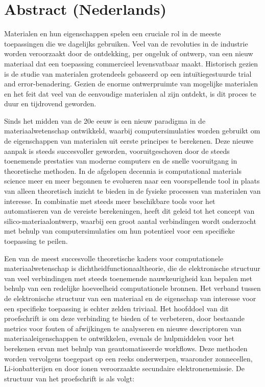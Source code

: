 \section*{Abstract (Nederlands)} \label{chapter:abstract_nederlands}

Materialen en hun eigenschappen spelen een cruciale rol in de meeste toepassingen die we dagelijks gebruiken. Veel van de revoluties in de industrie worden veroorzaakt door de ontdekking, per ongeluk of ontwerp, van een nieuw materiaal dat een toepassing commercieel levensvatbaar maakt. Historisch gezien is de studie van materialen grotendeels gebaseerd op een intuïtiegestuurde trial and error-benadering. Gezien de enorme ontwerpruimte van mogelijke materialen en het feit dat veel van de eenvoudige materialen al zijn ontdekt, is dit proces te duur en tijdrovend geworden.

Sinds het midden van de 20e eeuw is een nieuw paradigma in de materiaalwetenschap ontwikkeld, waarbij computersimulaties worden gebruikt om de eigenschappen van materialen uit eerste principes te berekenen. Deze nieuwe aanpak is steeds succesvoller geworden, vooruitgeschoven door de steeds toenemende prestaties van moderne computers en de snelle vooruitgang in theoretische methoden. In de afgelopen decennia is computational materials science meer en meer begonnen te evolueren naar een voorspellende tool in plaats van alleen theoretisch inzicht te bieden in de fysieke processen van materialen van interesse. In combinatie met steeds meer beschikbare tools voor het automatiseren van de vereiste berekeningen, heeft dit geleid tot het concept van silico-materiaalontwerp, waarbij een groot aantal verbindingen wordt onderzocht met behulp van computersimulaties om hun potentieel voor een specifieke toepassing te peilen.

Een van de meest succesvolle theoretische kaders voor computationele materiaalwetenschap is dichtheidfunctionaaltheorie, die de elektronische structuur van veel verbindingen met steeds toenemende nauwkeurigheid kan bepalen met behulp van een redelijke hoeveelheid computationele bronnen. Het verband tussen de elektronische structuur van een materiaal en de eigenschap van interesse voor een specifieke toepassing is echter zelden triviaal. Het hoofddoel van dit proefschrift is om deze verbinding te bieden of te verbeteren, door bestaande metrics voor fouten of afwijkingen te analyseren en nieuwe descriptoren van materiaaleigenschappen te ontwikkelen, evenals de hulpmiddelen voor het berekenen ervan met behulp van geautomatiseerde workflows. Deze methoden worden vervolgens toegepast op een reeks onderwerpen, waaronder zonnecellen, Li-ionbatterijen en door ionen veroorzaakte secundaire elektronenemissie. De structuur van het proefschrift is als volgt:

